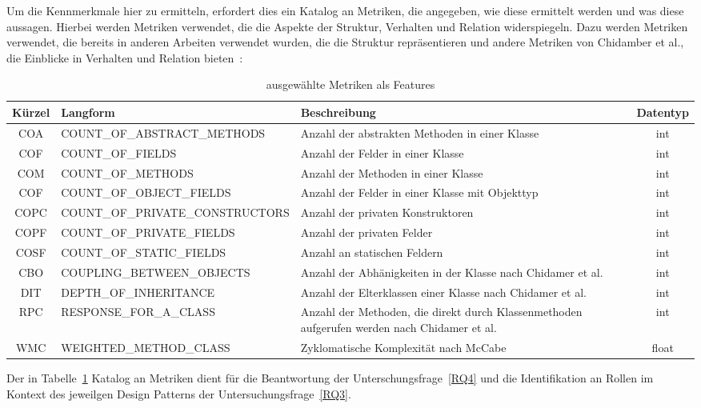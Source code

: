 Um die Kennmerkmale hier zu ermitteln, erfordert dies ein Katalog an Metriken, die angegeben, wie diese ermittelt werden und was diese aussagen. Hierbei werden Metriken verwendet, die die Aspekte der Struktur, Verhalten und Relation widerspiegeln.
Dazu werden Metriken verwendet, die bereits in anderen Arbeiten verwendet wurden, die die Struktur repräsentieren und andere Metriken von Chidamber et al., die Einblicke in Verhalten und Relation bieten~\cite{chidamber1994metrics}:


\begin{table}[H]
    \begin{tabular}{|c|p{0,45\linewidth}|p{0,35\linewidth}|c|}
        \hline
        Kürzel & Langform &Beschreibung & Datentyp\\
        \hline
        COA & COUNT\_OF\_ABSTRACT\_METHODS & Anzahl der abstrakten Methoden in einer Klasse & int\\
        COF & COUNT\_OF\_FIELDS & Anzahl der Felder in einer Klasse & int\\
        COM & COUNT\_OF\_METHODS & Anzahl der Methoden in einer Klasse & int\\
        COF & COUNT\_OF\_OBJECT\_FIELDS &Anzahl der Felder in einer Klasse mit Objekttyp & int\\
        COPC & COUNT\_OF\_PRIVATE\_CONSTRUCTORS & Anzahl der privaten Konstruktoren & int\\
        COPF & COUNT\_OF\_PRIVATE\_FIELDS & Anzahl der privaten Felder & int\\
        COSF & COUNT\_OF\_STATIC\_FIELDS & Anzahl an statischen Feldern & int\\
        CBO & COUPLING\_BETWEEN\_OBJECTS & Anzahl der Abhänigkeiten in der Klasse nach Chidamer et al. & int\\
        DIT & DEPTH\_OF\_INHERITANCE & Anzahl der Elterklassen einer Klasse nach Chidamer et al. & int\\
        RPC & RESPONSE\_FOR\_A\_CLASS & Anzahl der Methoden, die direkt durch Klassenmethoden aufgerufen werden nach Chidamer et al. & int\\
        WMC & WEIGHTED\_METHOD\_CLASS & Zyklomatische Komplexität nach McCabe~\cite{mccabe1976complexity} & float\\
        \hline
    \end{tabular}
    \caption{ausgewählte Metriken als Features}
    \label{tab:features}
\end{table}

Der in Tabelle~\ref{tab:features} Katalog an Metriken dient für die Beantwortung der Unterschungsfrage~\ref{RQ4} und die Identifikation an Rollen im Kontext des jeweilgen Design Patterns der Untersuchungsfrage~\ref{RQ3}.

